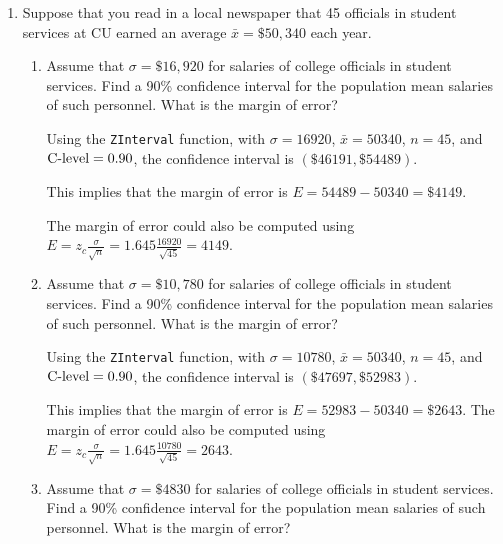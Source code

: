 \documentclass{article}
\newcommand{\answer}[1]{\color{red}#1}
\begin{document}
\pagestyle{myheadings}

\begin{center}
\textbf{}
\end{center}

\begin{enumerate}
	
\item Suppose that you read in a local newspaper that 45 officials in student services at CU earned an average $\bar x = \$50,340$ each year.

	\begin{enumerate}
	\item Assume that $\sigma = \$16,920$ for salaries of college officials in student services. Find a 90\% confidence interval for the population mean salaries of such personnel. What is the margin of error? 
	
	{\answer Using the \texttt{ZInterval} function, with $\sigma = 16920$, $\bar{x} = 50340$, $n=45$, and $\textnormal{C-level} = 0.90$, the confidence interval is $(\$46191, \$54489)$. 
	
	This implies that the margin of error is $E = 54489 - 50340 = \$4149$. 
	
	The margin of error could also be computed using $\displaystyle E = z_c\frac{\sigma}{\sqrt{n}} = 1.645\frac{16920}{\sqrt{45}} = 4149$.
	} 

	\item Assume that $\sigma = \$10,780$ for salaries of college officials in student services. Find a 90\% confidence interval for the population mean salaries of such personnel. What is the margin of error? 
	
	{\answer Using the \texttt{ZInterval} function, with $\sigma = 10780$, $\bar{x} = 50340$, $n=45$, and $\textnormal{C-level} = 0.90$, the confidence interval is $(\$47697, \$52983)$. 
	
	This implies that the margin of error is $E = 52983 - 50340 = \$2643$. 
	The margin of error could also be computed using $\displaystyle E = z_c\frac{\sigma}{\sqrt{n}} = 1.645\frac{10780}{\sqrt{45}} = 2643$.
	} 

	\item Assume that $\sigma = \$4830$ for salaries of college officials in student services. Find a 90\% confidence interval for the population mean salaries of such personnel. What is the margin of error? 
	

\end{enumerate}
\end{enumerate}
\end{document}
